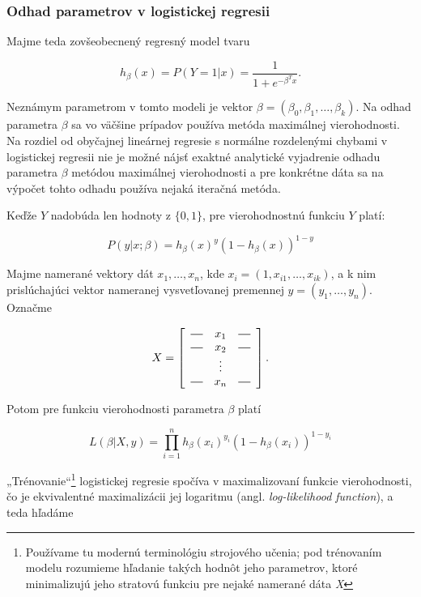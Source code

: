 \subsubsection{Odhad parametrov v logistickej regresii}

Majme teda zovšeobecnený regresný model tvaru

\[
h_\beta(x) = P(Y = 1|x) = \frac{1}{1 + e^{-\beta^T x}}.
\]

Neznámym parametrom v tomto modeli je vektor \( \beta = (\beta_0, \beta_1, \ldots, \beta_k) \).
Na odhad parametra \( \beta \) sa vo väčšine prípadov používa metóda maximálnej vierohodnosti.
Na rozdiel od obyčajnej lineárnej regresie s normálne rozdelenými chybami
v logistickej regresii nie je možné nájsť exaktné analytické vyjadrenie odhadu parametra \( \beta \) metódou maximálnej vierohodnosti
a pre konkrétne dáta sa na výpočet tohto odhadu používa nejaká iteračná metóda.

Keďže \(Y\) nadobúda len hodnoty z \( \{0, 1\} \), pre vierohodnostnú funkciu \(Y\) platí:

\[
P(y | x; \beta ) = h_\beta(x)^y (1 - h_\beta(x))^{1 - y}
\]

Majme namerané vektory dát \( x_1, \ldots, x_n \), kde \( x_i = (1, x_{i1}, \ldots, x_{ik}) \),
a k nim prislúchajúci vektor nameranej vysvetľovanej premennej \(y = (y_1, \ldots, y_n )\). Označme

\[
    X =
    \left[
        \begin{array}{ccc}
            \horzbar & x_{1} & \horzbar \\
            \horzbar & x_{2} & \horzbar \\
                    & \vdots    &          \\
            \horzbar & x_{n} & \horzbar
        \end{array}
    \right].
\]


Potom pre funkciu vierohodnosti parametra \( \beta \) platí

\[
L(\beta | X, y) = \prod_{i = 1}^n h_\beta(x_i)^{y_i} (1 - h_\beta(x_i))^{1 - y_i}
\]

„Trénovanie“\footnote{Používame tu modernú terminológiu strojového učenia; pod trénovaním  modelu rozumieme hľadanie takých hodnôt jeho parametrov, ktoré minimalizujú jeho stratovú funkciu pre nejaké namerané dáta \emph{X}}
logistickej regresie spočíva v maximalizovaní funkcie vierohodnosti,
čo je ekvivalentné maximalizácii jej logaritmu (angl. \emph{log-likelihood function}), a teda hľadáme

